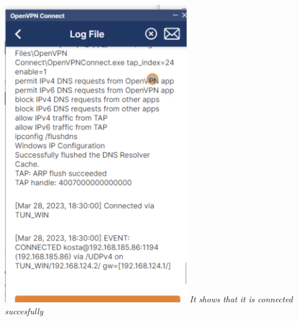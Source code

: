 \documentclass[12pt, letterpaper]{article}
\begin{document}
\hfill\break
\hfill\break
\includegraphics[width=0.6\textwidth]{fotos/Week 6/Vpn/Vpn connect log.jpeg}
\break
\emph{It shows that it is connected succesfully}
\hfill\break
\hfill\break
\newpage
\end{document}
